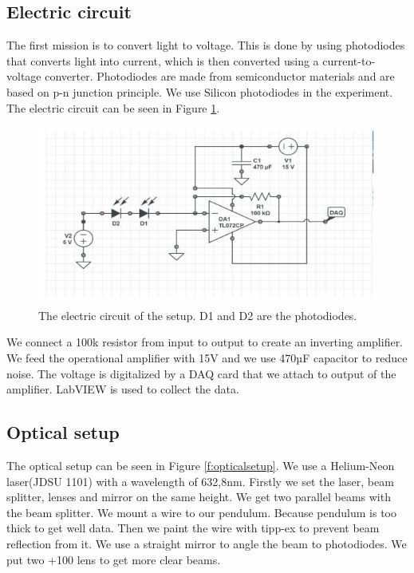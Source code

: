 \documentclass[11pt, a4paper]{article}
\begin{document}
\subsection{Electric circuit}
\label{s:Electric circuit}
The first mission is to convert light to voltage. This is done by using photodiodes that converts light into current, which is then converted using a current-to-voltage converter.
Photodiodes are made from semiconductor materials and are based on p-n junction principle. We use Silicon photodiodes in the experiment. The electric circuit can be seen in Figure \ref{f:circuit}.
\begin{figure}[h]
	\centering
	\includegraphics{circuit}
	\caption{The electric circuit of the setup. D1 and D2 are the photodiodes.}
	\label{f:circuit}
\end{figure}

We connect a 100k resistor from input to output to create an inverting amplifier. We feed the operational amplifier with 15V and we use 470µF capacitor to reduce noise. The voltage is digitalized by a DAQ card that we attach to output of the amplifier. LabVIEW is used to collect the data.

\subsection{Optical setup}
\label{s:Optical setup}
The optical setup can be seen in Figure \ref{f:opticalsetup}. We use a Helium-Neon  laser(JDSU 1101) with a wavelength of 632,8nm. Firstly we set the laser, beam splitter, lenses and mirror on the same height. We get two parallel beams with the beam splitter. 
We mount a wire to our pendulum. Because pendulum is too thick to get well data. Then we paint the wire with tipp-ex to prevent beam reflection from it. We use a straight mirror to angle the beam to photodiodes. We put two +100 lens to get more clear beams.
\end{document}
